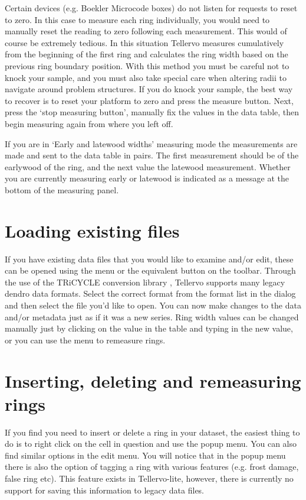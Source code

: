 Certain devices (e.g. Boekler Microcode boxes) do not listen for requests to reset to zero.  In this case to measure each ring individually, you would need to manually reset the reading to zero following each measurement.  This would of course be extremely tedious.  In this situation Tellervo measures cumulatively from the beginning of the first ring and calculates the ring width based on the previous ring boundary position.  With this method you must be careful not to knock your sample, and you must also take special care when altering radii to navigate around problem structures.  If you do knock your sample, the best way to recover is to reset your platform to zero and press the measure button.  Next, press the `stop measuring button', manually fix the values in the data table, then begin measuring again from where you left off.

If you are in `Early and latewood widths' measuring mode the measurements are made and sent to the data table in pairs.  The first measurement should be of the earlywood of the ring, and the next value the latewood measurement.  Whether you are currently measuring early or latewood is indicated as a message at the bottom of the measuring panel.


\section{Loading existing files}

If you have existing data files that you would like to examine and/or edit, these can be opened using the  menu or the equivalent button on the toolbar.  Through the use of the TRiCYCLE conversion library \citep{tricycle}, Tellervo supports many legacy dendro data formats.  Select the correct format from the format list in the dialog and then select the file you'd like to open.  You can now make changes to the data and/or metadata just as if it was a new series.  Ring width values can be changed manually just by clicking on the value in the table and typing in the new value, or you can use the  menu to remeasure rings.

\section{Inserting, deleting and remeasuring rings}

If you find you need to insert or delete a ring in your dataset, the easiest thing to do is to right click on the cell in question and use the popup menu.  You can also find similar options in the edit menu.  You will notice that in the popup menu there is also the option of tagging a ring with various features (e.g. frost damage, false ring etc).  This feature exists in Tellervo-lite, however, there is currently no support for saving this information to legacy data files.  

